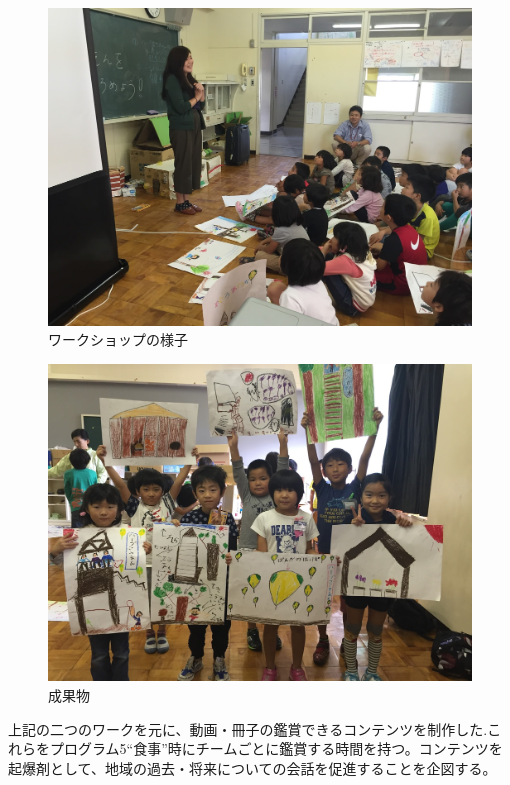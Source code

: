 \documentclass[a4paper]{jsarticle}
\begin{document}
\begin{figure}[H]
  \begin{center}
    \includegraphics[width=0.8\hsize]{./images/06.jpg}
    \caption{ワークショップの様子}
    \label{fig:tmu_hino}
  \end{center}
\end{figure}
\begin{figure}[H]
  \begin{center}
    \includegraphics[width=0.8\hsize]{./images/07.jpg}
    \caption{成果物}
    \label{fig:tmu_hino}
  \end{center}
\end{figure}
\par
上記の二つのワークを元に、動画・冊子の鑑賞できるコンテンツを制作した.これらをプログラム5“食事”時にチームごとに鑑賞する時間を持つ。コンテンツを起爆剤として、地域の過去・将来についての会話を促進することを企図する。\\\\
\end{document}
